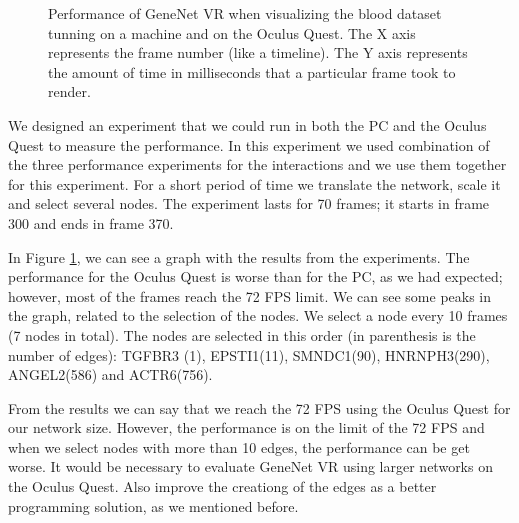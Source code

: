 \begin{figure}[h!]
  \centering
  \begin{minipage}{.8\textwidth}
  \end{minipage}
\caption{Performance of GeneNet VR when visualizing the blood dataset tunning on a machine and on the Oculus Quest. The X axis represents the frame number (like a timeline). The Y axis represents the amount of time in milliseconds that a particular frame took to render.}
\label{fig:pc_vs_oculus}
\end{figure}

We designed an experiment that we could run in both the PC and the Oculus Quest to measure the performance. In this experiment we used combination of the three performance experiments for the interactions and we use them together for this experiment. For a short period of time we translate the network, scale it and select several nodes. The experiment lasts for 70 frames; it starts in frame 300 and ends in frame 370.

In Figure \ref{fig:pc_vs_oculus}, we can see a graph with the results from the experiments. The performance for the Oculus Quest is worse than for the PC, as we had expected; however, most of the frames reach the 72 FPS limit. We can see some peaks in the graph, related to the selection of the nodes. We select a node every 10 frames (7 nodes in total). The nodes are selected in this order (in parenthesis is the number of edges): TGFBR3 (1), EPSTI1(11), SMNDC1(90), HNRNPH3(290), ANGEL2(586) and ACTR6(756).

From the results we can say that we reach the 72 FPS using the Oculus Quest for our network size. However, the performance is on the limit of the 72 FPS and when we select nodes with more than 10 edges, the performance can be get worse. It would be necessary to evaluate GeneNet VR using larger networks on the Oculus Quest. Also improve the creationg of the edges as a better programming solution, as we mentioned before.

